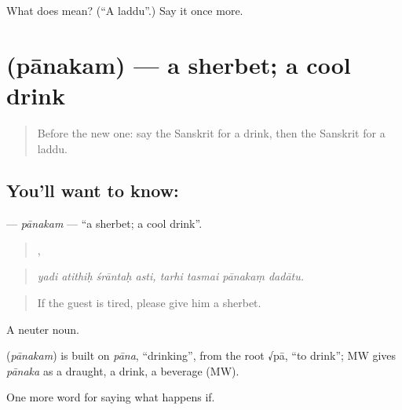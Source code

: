 \begin{tcolorbox}[breakable,colback=teal!4,colframe=teal!35!black,title={Before you move on}]
What does  mean? (\textquotedblleft{}A laddu\textquotedblright{}.) Say it once more.
\end{tcolorbox}
\section[\texorpdfstring{\sk{पानकम्} (pānakam)}{पानकम् (pānakam)}]{ (pānakam) — a sherbet; a cool drink}

\label{lesson:SA-C530-panakam}



\begin{quote}
Before the new one: say the Sanskrit for a drink, then the Sanskrit for a laddu.
\end{quote}

\subsection*{You'll want to know: }
\textbf{} — \emph{pānakam} — \textquotedblleft{}a sherbet; a cool drink\textquotedblright{}.

\begin{quote}
   ,    
\end{quote}

\begin{quote}
\emph{yadi atithiḥ śrāntaḥ asti, tarhi tasmai pānakaṃ dadātu.}
\end{quote}

\begin{quote}
If the guest is tired, please give him a sherbet.
\end{quote}

A neuter noun.

\begin{cousinweb}
\textbf{} (\emph{pānakam}) is built on \emph{pāna}, \textquotedblleft{}drinking\textquotedblright{}, from the root √pā, \textquotedblleft{}to drink\textquotedblright{}; MW gives \emph{pānaka} as a draught, a drink, a beverage (MW).
\end{cousinweb}

\begin{grammarlens}[title={What you've built}]
One more word for saying what happens if.
\end{grammarlens}

